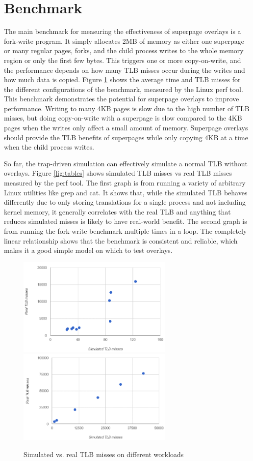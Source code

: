\section{Benchmark}
The main benchmark for measuring the effectiveness of superpage overlays is a fork-write program. It simply allocates 2MB of memory as either one superpage or many regular pages, forks, and the child process writes to the whole memory region or only the first few bytes. This triggers one or more copy-on-write, and the performance depends on how many TLB misses occur during the writes and how much data is copied. Figure \ref{fig:charts} shows the average time and TLB misses for the different configurations of the benchmark, measured by the Linux perf tool. This benchmark demonstrates the potential for superpage overlays to improve performance. Writing to many 4KB pages is slow due to the high number of TLB misses, but doing copy-on-write with a superpage is slow compared to the 4KB pages when the writes only affect a small amount of memory. Superpage overlays should provide the TLB benefits of superpages while only copying 4KB at a time when the child process writes.

So far, the trap-driven simulation can effectively simulate a normal TLB without overlays. Figure \ref{fig:tables} shows simulated TLB misses vs real TLB misses measured by the perf tool. The first graph is from running a variety of arbitrary Linux utilities like grep and cat. It shows that, while the simulated TLB behaves differently due to only storing translations for a single process and not including kernel memory, it generally correlates with the real TLB and anything that reduces simulated misses is likely to have real-world benefit. The second graph is from running the fork-write benchmark multiple times in a loop. The completely linear relationship shows that the benchmark is consistent and reliable, which makes it a good simple model on which to test overlays.
\begin{figure}
    \centering
    \includegraphics[width=3in]{Figures/Graph1}
    \includegraphics[width=3in]{Figures/Graph2}
    \caption{Simulated vs. real TLB misses on different workloads}
    \label{fig:charts}
\end{figure}


